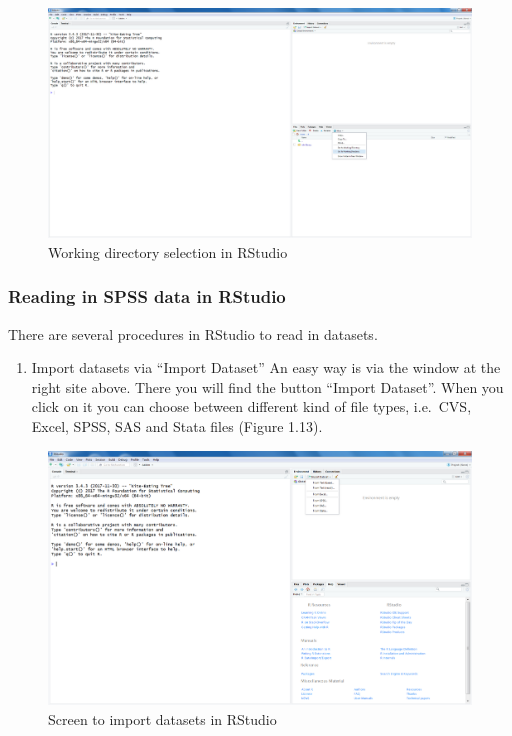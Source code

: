 \documentclass[]{book}
\providecommand{\tightlist}{%
  \setlength{\itemsep}{0pt}\setlength{\parskip}{0pt}}
\theoremstyle{definition}
\theoremstyle{definition}
\theoremstyle{definition}
\theoremstyle{remark}
\begin{document}
\begin{figure}

{\centering \includegraphics[width=0.8\linewidth]{images/fig1.12} 

}

\caption{Working directory selection in RStudio}\label{fig:fig12}
\end{figure}

\subsubsection{Reading in SPSS data in
RStudio}\label{reading-in-spss-data-in-rstudio}

There are several procedures in RStudio to read in datasets.

\begin{enumerate}
\def\labelenumi{\arabic{enumi}.}
\tightlist
\item
  Import datasets via ``Import Dataset'' An easy way is via the window
  at the right site above. There you will find the button ``Import
  Dataset''. When you click on it you can choose between different kind
  of file types, i.e.~CVS, Excel, SPSS, SAS and Stata files (Figure
  1.13).
\end{enumerate}

\begin{figure}

{\centering \includegraphics[width=0.8\linewidth]{images/fig1.13} 

}

\caption{Screen to import datasets in RStudio}\label{fig:fig13}
\end{figure}
\end{document}
